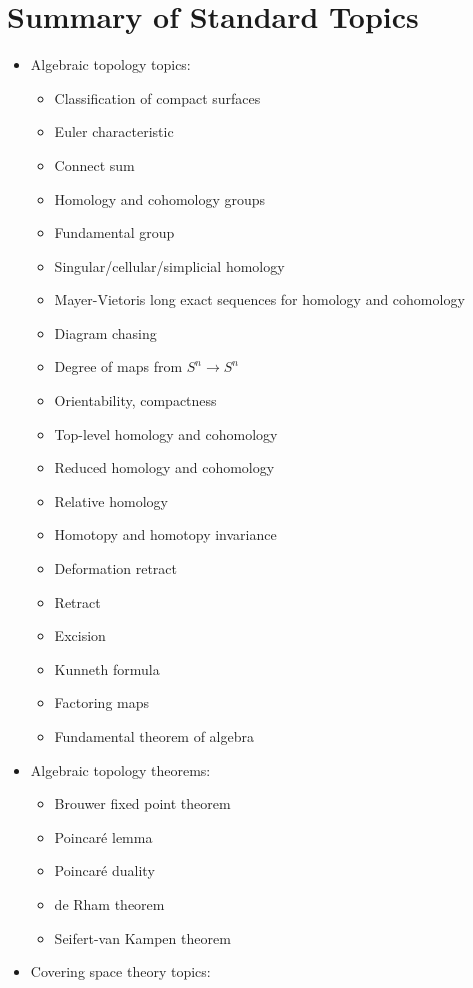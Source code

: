 \hypertarget{summary-of-standard-topics}{%
\section{Summary of Standard Topics}\label{summary-of-standard-topics}}

\begin{itemize}
\tightlist
\item
  Algebraic topology topics:

  \begin{itemize}
  \tightlist
  \item
    Classification of compact surfaces
  \item
    Euler characteristic
  \item
    Connect sum
  \item
    Homology and cohomology groups
  \item
    Fundamental group
  \item
    Singular/cellular/simplicial homology
  \item
    Mayer-Vietoris long exact sequences for homology and cohomology
  \item
    Diagram chasing
  \item
    Degree of maps from \(S^n \to S^n\)
  \item
    Orientability, compactness
  \item
    Top-level homology and cohomology
  \item
    Reduced homology and cohomology
  \item
    Relative homology
  \item
    Homotopy and homotopy invariance
  \item
    Deformation retract
  \item
    Retract
  \item
    Excision
  \item
    Kunneth formula
  \item
    Factoring maps
  \item
    Fundamental theorem of algebra
  \end{itemize}
\item
  Algebraic topology theorems:

  \begin{itemize}
  \tightlist
  \item
    Brouwer fixed point theorem
  \item
    Poincaré lemma
  \item
    Poincaré duality
  \item
    de Rham theorem
  \item
    Seifert-van Kampen theorem
  \end{itemize}
\item
  Covering space theory topics:


\end{itemize}
